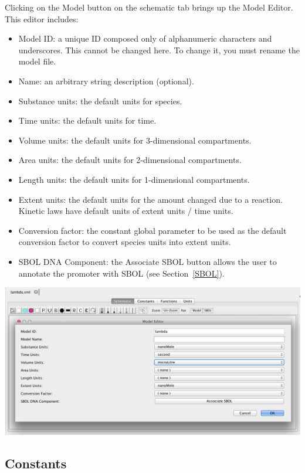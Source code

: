 \documentclass[titlepage,11pt]{article}
\begin{document}
\noindent
Clicking on the Model button on the schematic tab brings up the Model Editor.  This editor includes:
\begin{itemize}
\item Model ID: a unique ID composed only of alphanumeric characters and underscores.  This cannot be changed here.  To change it, you must rename the model file.
\item Name: an arbitrary string description (optional).
\item Substance units: the default units for species.
\item Time units: the default units for time.
\item Volume units: the default units for 3-dimensional compartments.
\item Area units: the default units for 2-dimensional compartments.
\item Length units: the default units for 1-dimensional compartments.
\item Extent units: the default units for the amount changed due to a reaction.  Kinetic laws have default units of extent units / time units.  
\item Conversion factor: the constant global parameter to be used as the default conversion factor to convert species units into extent units.
\item SBOL DNA Component: the Associate SBOL button allows the user to annotate the promoter with SBOL (see Section~\ref{SBOL}).
\end{itemize}

\begin{center}
\includegraphics[width=160mm]{screenshots/ModelUnits}
\end{center}

\clearpage

\subsection{\label{Constants}Constants}
\end{document}
